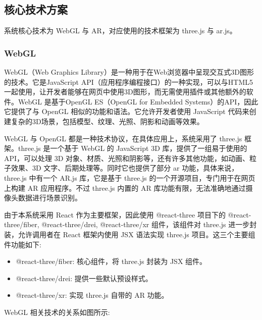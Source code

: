 \subsection{核心技术方案}

系统核心技术为 WebGL 与 AR，对应使用的技术框架为 three.js 与 ar.js。

\subsubsection{WebGL}

WebGL（Web Graphics Library）是一种用于在Web浏览器中呈现交互式3D图形的技术。它是JavaScript API（应用程序编程接口）的一种实现，可以与HTML5一起使用，让开发者能够在网页中使用3D图形，而无需使用插件或其他额外的软件。WebGL 是基于OpenGL ES（OpenGL for Embedded Systems）的API，因此它提供了与 OpenGL 相似的功能和语法。它允许开发者使用 JavaScript 代码来创建复杂的3D场景，包括模型、纹理、光照、阴影和动画等效果。\cite{cantor2012webgl}

WebGL 与 OpenGL 都是一种技术协议，在具体应用上，系统采用了 three.js 框架。three.js 是一个基于 WebGL 的 JavaScript 3D 库，提供了一组易于使用的 API，可以处理 3D 对象、材质、光照和阴影等，还有许多其他功能，如动画、粒子效果、3D 文字、后期处理等。同时它也提供了部分 ar 功能，具体来说，three.js 中有一个 AR.js 库，它是基于 three.js 的一个开源项目，专门用于在网页上构建 AR 应用程序。不过 three.js 内置的 AR 库功能有限，无法准确地通过摄像头数据进行场景识别。

由于本系统采用 React 作为主要框架，因此使用 @react-three 项目下的 @react-three/fiber, @react-three/drei, @react-three/xr 组件，该组件对 three.js 进一步封装，允许调用者在 React 框架内使用 JSX 语法实现 three.js 项目。这三个主要组件功能如下:
\begin{itemize}
  \item @react-three/fiber: 核心组件，将 three.js 封装为 JSX 组件。
  \item @react-three/drei: 提供一些默认预设样式。
  \item @react-three/xr: 实现 three.js 自带的 AR 功能。
\end{itemize}

WebGL 相关技术的关系如图所示:

